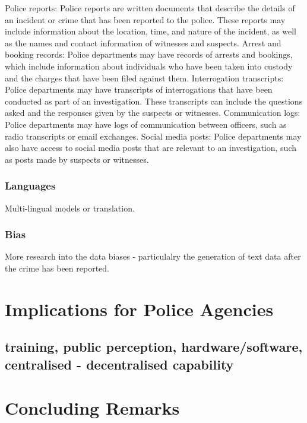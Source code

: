 Police reports: Police reports are written documents that describe the details of an incident or crime that has been reported to the police. These reports may include information about the location, time, and nature of the incident, as well as the names and contact information of witnesses and suspects.
Arrest and booking records: Police departments may have records of arrests and bookings, which include information about individuals who have been taken into custody and the charges that have been filed against them.
Interrogation transcripts: Police departments may have transcripts of interrogations that have been conducted as part of an investigation. These transcripts can include the questions asked and the responses given by the suspects or witnesses.
Communication logs: Police departments may have logs of communication between officers, such as radio transcripts or email exchanges.
Social media posts: Police departments may also have access to social media posts that are relevant to an investigation, such as posts made by suspects or witnesses.
\subsubsection{Languages} Multi-lingual models or translation.

\subsubsection{Bias} More research into the data biases - particulalry the generation of text data after the crime has been reported.



\section{Implications for Police Agencies}

\subsection{training, public perception, hardware/software, centralised - decentralised capability}


\section{Concluding Remarks}






